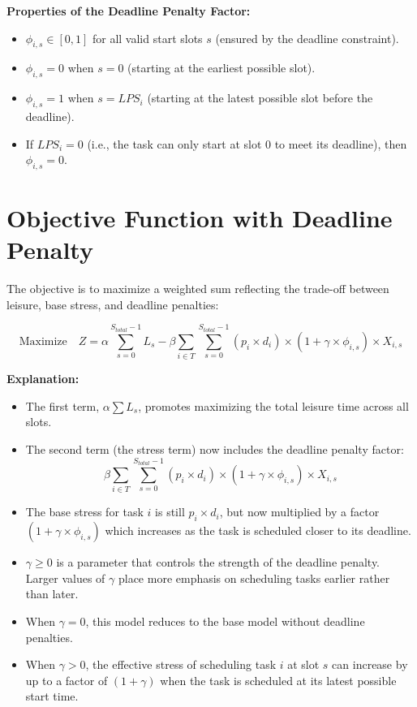 \documentclass{article}
\begin{document}
\textbf{Properties of the Deadline Penalty Factor:}
\begin{itemize}
    \item $\phi_{i,s} \in [0, 1]$ for all valid start slots $s$ (ensured by the deadline constraint).
    \item $\phi_{i,s} = 0$ when $s = 0$ (starting at the earliest possible slot).
    \item $\phi_{i,s} = 1$ when $s = LPS_i$ (starting at the latest possible slot before the deadline).
    \item If $LPS_i = 0$ (i.e., the task can only start at slot 0 to meet its deadline), then $\phi_{i,s} = 0$.
\end{itemize}

\section{Objective Function with Deadline Penalty}

The objective is to maximize a weighted sum reflecting the trade-off between leisure, base stress, and deadline penalties:

\[
\text{Maximize} \quad Z = \alpha \sum_{s=0}^{S_{total}-1} L_s - \beta \sum_{i \in T} \sum_{s=0}^{S_{total}-1} (p_i \times d_i) \times (1 + \gamma \times \phi_{i,s}) \times X_{i,s}
\]

\textbf{Explanation:}
\begin{itemize}
    \item The first term, $\alpha \sum L_s$, promotes maximizing the total leisure time across all slots.
    
    \item The second term (the stress term) now includes the deadline penalty factor:
    \[ \beta \sum_{i \in T} \sum_{s=0}^{S_{total}-1} (p_i \times d_i) \times (1 + \gamma \times \phi_{i,s}) \times X_{i,s} \]
    
    \item The base stress for task $i$ is still $p_i \times d_i$, but now multiplied by a factor $(1 + \gamma \times \phi_{i,s})$ which increases as the task is scheduled closer to its deadline.
    
    \item $\gamma \geq 0$ is a parameter that controls the strength of the deadline penalty. Larger values of $\gamma$ place more emphasis on scheduling tasks earlier rather than later.
    
    \item When $\gamma = 0$, this model reduces to the base model without deadline penalties.
    
    \item When $\gamma > 0$, the effective stress of scheduling task $i$ at slot $s$ can increase by up to a factor of $(1 + \gamma)$ when the task is scheduled at its latest possible start time.
\end{itemize}
\end{document}
